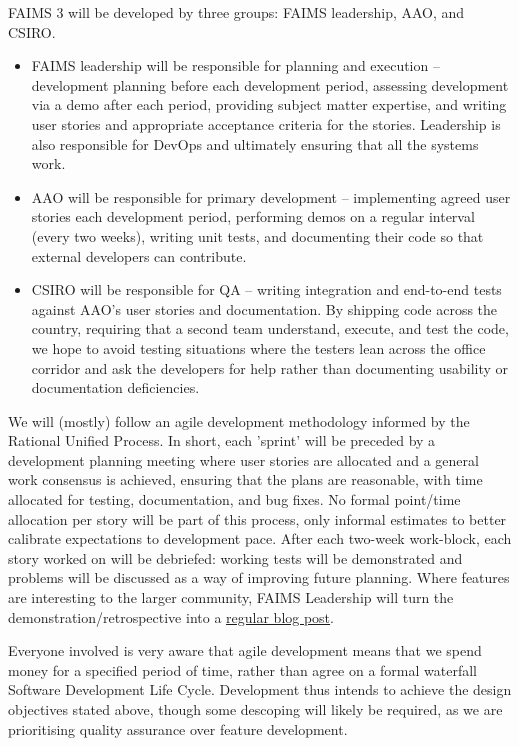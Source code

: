 \documentclass{faims3_report}
\begin{document}
FAIMS 3 will be developed by three groups: FAIMS leadership, AAO, and
CSIRO.

\begin{itemize}
\item FAIMS leadership will be responsible for planning and execution --
  development planning before each development period, assessing
  development via a demo after each period, providing subject matter
  expertise, and writing user stories and appropriate acceptance
  criteria for the stories. Leadership is also responsible for DevOps
  and ultimately ensuring that all the systems work.
 
\item AAO will be responsible for primary development -- implementing
  agreed user stories each development period, performing demos on a
  regular interval (every two weeks), writing unit tests, and
  documenting their code so that external developers can contribute.
 
\item CSIRO will be responsible for QA -- writing integration and
  end-to-end tests against AAO's user stories and documentation. By
  shipping code across the country, requiring that a second team
  understand, execute, and test the code, we hope to avoid testing
  situations where the testers lean across the office corridor and ask
  the developers for help rather than documenting usability or
  documentation deficiencies.
 
\end{itemize}

We will (mostly) follow an agile development methodology informed by the
Rational Unified Process. In short, each 'sprint' will be preceded by a
development planning meeting where user stories are allocated and a
general work consensus is achieved, ensuring that the plans are
reasonable, with time allocated for testing, documentation, and bug
fixes. No formal point/time allocation per story will be part of this
process, only informal estimates to better calibrate expectations to
development pace. After each two-week work-block, each story worked on
will be debriefed: working tests will be demonstrated and problems will
be discussed as a way of improving future planning. Where features are
interesting to the larger community, FAIMS Leadership will turn the
demonstration/retrospective into a
\href{https://factorio.com/blog/}{{regular blog post}}.

Everyone involved is very aware that agile development means that we
spend money for a specified period of time, rather than agree on a
formal waterfall Software Development Life Cycle. Development thus
intends to achieve the design objectives stated above, though some
descoping will likely be required, as we are prioritising quality
assurance over feature development.
\end{document}
